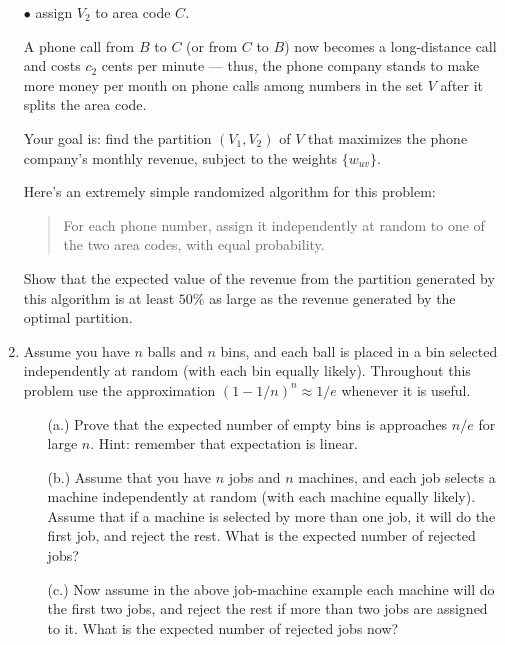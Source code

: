 \documentclass[12pt]{article}
\begin{document}
\begin{enumerate}
$\bullet$ assign $V_2$ to area code $C$.

A phone call from $B$ to $C$ (or from $C$ to $B$)
now becomes a long-distance call and
costs $c_2$ cents per minute --- thus,
the phone company stands to make more money per month on
phone calls among numbers in the set $V$
after it splits the area code.

Your goal is: find the partition $(V_1, V_2)$ of $V$
that maximizes the phone company's monthly revenue,
subject to the weights $\{w_{uv}\}$.

Here's an extremely simple randomized algorithm for this problem:
\begin{quote}
For each phone number, assign it independently at random
to one of the two area codes, with equal probability.
\end{quote}
Show that the expected value of the revenue from the partition
generated by this algorithm is at least $50\%$
as large as the revenue generated by the optimal partition.



\item

Assume you have $n$ balls and $n$
bins, and each ball is placed in a bin
selected independently at random (with each bin equally likely).
Throughout this problem use the approximation $(1-1/n)^n \approx 1/e$
whenever it is useful.
\begin{itemize}
\item[(a.)] Prove that the expected number of empty bins
is approaches $n/e$ for large $n$. Hint: remember that
expectation is linear.
\item[(b.)] Assume that you have $n$ jobs and $n$
machines, and each job selects a machine independently at
random (with each machine equally likely). Assume that if
a machine is selected by more than one job,
it will do the first job, and reject the
rest. What is the expected number of rejected jobs?
\item[(c.)] Now assume in the above job-machine example each
machine will do the first two jobs, and reject
the rest if more than two jobs are assigned
to it. What is the expected number of rejected
jobs now?
\end{itemize}


\end{enumerate}
\end{document}
